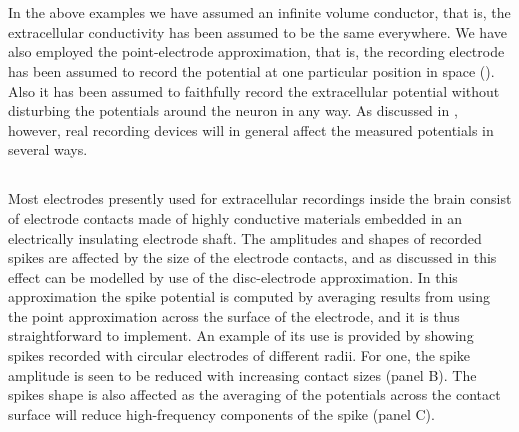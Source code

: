 \section{}
In the above examples we have assumed an infinite volume conductor, that is, the extracellular conductivity
has been assumed to be the same everywhere. We have also employed
the point-electrode approximation, that is, the recording electrode has been assumed  
to record the potential at one particular position in space (). Also it has been assumed
to faithfully record the extracellular potential without disturbing the potentials around the neuron
in any way.  As discussed in , however, real recording devices will in general affect
the measured potentials in several ways.  

\subsection{}
\label{sec:Spikes:electrode_size}
Most electrodes presently used for extracellular recordings inside the brain consist of electrode contacts made of
highly conductive materials embedded in an electrically insulating electrode shaft. The amplitudes and shapes of 
recorded spikes are affected by the size of the electrode contacts, and as discussed in 
this effect can be modelled by use of the disc-electrode approximation. In this approximation the spike potential is computed
by averaging results from using the point approximation across the surface of the electrode, and it is thus straightforward to implement.
 An example of its use
is provided by  showing spikes recorded with circular electrodes of different radii.
For one, the spike amplitude is seen to be reduced with increasing contact sizes (panel B). The spikes shape is also affected as the 
averaging of the potentials across the contact surface will reduce high-frequency components of the spike (panel C).

